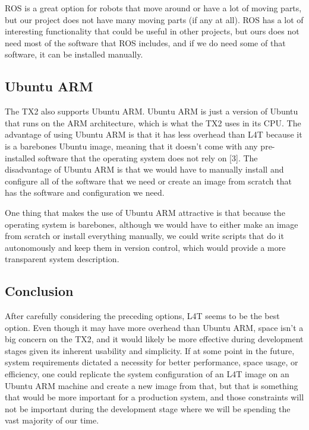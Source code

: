 \documentclass[letterpaper,10pt,serif,draftclsnofoot,onecolumn,compsoc,titlepage]{IEEEtran}
\begin{document}
ROS is a great option for robots that move around or have a lot of moving parts, but our project does not have many moving parts (if any at all). ROS has a lot of interesting functionality that could be useful in other projects, but ours does not need most of the software that ROS includes, and if we do need some of that software, it can be installed manually.

\subsection{Ubuntu ARM}
The TX2 also supports Ubuntu ARM. Ubuntu ARM is just a version of Ubuntu that runs on the ARM architecture, which is what the TX2 uses in its CPU. The advantage of using Ubuntu ARM is that it has less overhead than L4T because it is a barebones Ubuntu image, meaning that it doesn’t come with any pre-installed software that the operating system does not rely on [3]. The disadvantage of Ubuntu ARM is that we would have to manually install and configure all of the software that we need or create an image from scratch that has the software and configuration we need. 

One thing that makes the use of Ubuntu ARM attractive is that because the operating system is barebones, although we would have to either make an image from scratch or install everything manually, we could write scripts that do it autonomously and keep them in version control, which would provide a more transparent system description.

\subsection{Conclusion}
After carefully considering the preceding options, L4T seems to be the best option. Even though it may have more overhead than Ubuntu ARM, space isn’t a big concern on the TX2, and it would likely be more effective during development stages given its inherent usability and simplicity. If at some point in the future, system requirements dictated a necessity for better performance, space usage, or efficiency, one could replicate the system configuration of an L4T image on an Ubuntu ARM machine and create a new image from that, but that is something that would be more important for a production system, and those constraints will not be important during the development stage where we will be spending the vast majority of our time.
\end{document}
